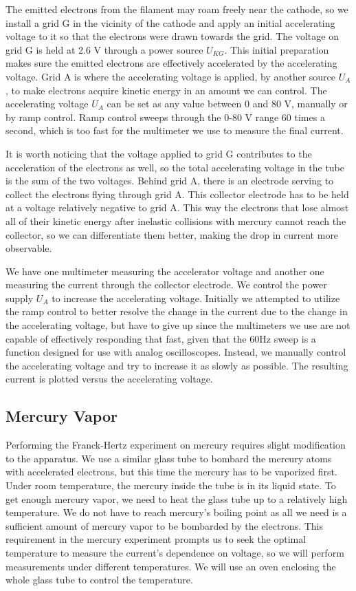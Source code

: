 \documentclass[prb,preprint]{revtex4-1}
\begin{document}
The emitted electrons from the filament may roam freely near the cathode, so we install a grid G in the vicinity of the cathode and apply an initial accelerating voltage to it so that the electrons were drawn towards the grid. The voltage on grid G is held at 2.6 V through a power source $U_{KG}$. This initial preparation makes sure the emitted electrons are effectively accelerated by the accelerating voltage. Grid A is where the accelerating voltage is applied, by another source $U_{A}$, to make electrons acquire kinetic energy in an amount we can control. The accelerating voltage $U_{A}$ can be set as any value between 0 and 80 V, manually or by ramp control. Ramp control sweeps through the 0-80 V range 60 times a second, which is too fast for the multimeter we use to measure the final current.

It is worth noticing that the voltage applied to grid G contributes to the acceleration of the electrons as well, so the total accelerating voltage in the tube is the sum of the two voltages. Behind grid A, there is an electrode serving to collect the electrons flying through grid A. This collector electrode has to be held at a voltage relatively negative to grid A. This way the electrons that lose almost all of their kinetic energy after inelastic collisions with mercury cannot reach the collector, so we can differentiate them better, making the drop in current more observable.

We have one multimeter measuring the accelerator voltage and another one measuring the current through the collector electrode. We control the power supply $U_{A}$ to increase the accelerating voltage. Initially we attempted to utilize the ramp control to better resolve the change in the current due to the change in the accelerating voltage, but have to give up since the multimeters we use are not capable of effectively responding that fast, given that the 60Hz sweep is a function designed for use with analog oscilloscopes. Instead, we manually control the accelerating voltage and try to increase it as slowly as possible. The resulting current is plotted versus the accelerating voltage.

\subsection{Mercury Vapor}

Performing the Franck-Hertz experiment on mercury requires slight modification to the apparatus. We use a similar glass tube to bombard the mercury atoms with accelerated electrons, but this time the mercury has to be vaporized first. Under room temperature, the mercury inside the tube is in its liquid state. To get enough mercury vapor, we need to heat the glass tube up to a relatively high temperature. We do not have to reach mercury's boiling point as all we need is a sufficient amount of mercury vapor to be bombarded by the electrons. This requirement in the mercury experiment prompts us to seek the optimal temperature to measure the current's dependence on voltage, so we will perform measurements under different temperatures. We will use an oven enclosing the whole glass tube to control the temperature.
\end{document}
